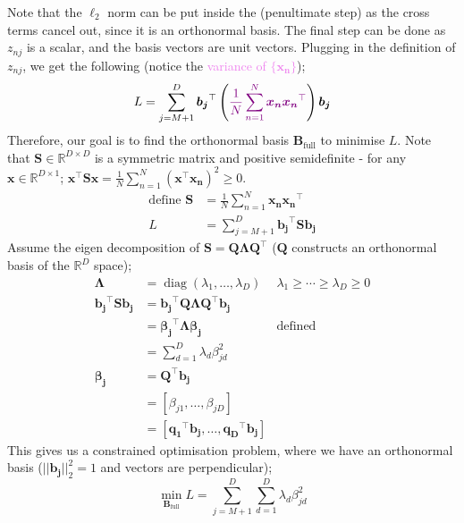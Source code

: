 \documentclass[a4paper, 12pt]{article}
\newcommand{\summation}[2]{\sum\limits_{#1}^{#2}}
\newcommand{\mat}[1]{\boldsymbol{#1}}
\renewcommand{\vec}[1]{\boldsymbol{#1}}
\newcommand{\mbbr}[0]{\mathbb{R}}
\DeclareMathOperator*{\diag}{diag}
\newcommand{\violet}[1]{\textcolor{violet}{#1}}
\begin{document}
                Note that the $\ell_2$ norm can be put inside the (penultimate step) as the cross terms cancel out, since it is an orthonormal basis.
                The final step can be done as $z_{nj}$ is a scalar, and the basis vectors are unit vectors.
                Plugging in the definition of $z_{nj}$, we get the following (notice the \violet{variance of $\{ \vec{x_n} \}$});
                $$L = \summation{j = M + 1}{D} \mat{b_j}^\top \left( \violet{\frac{1}{N} \summation{n = 1}{N} \mat{x_n}\mat{x_n}^\top} \right) \mat{b_j}$$
                Therefore, our goal is to find the orthonormal basis $\mat{B}_\text{full}$ to minimise $L$.
                Note that $\mat{S} \in \mbbr^{D \times D}$ is a symmetric matrix and positive semidefinite - for any $\mat{x} \in \mbbr^{D \times 1}$;
                $\mat{x}^\top\mat{S}\mat{x} = \frac{1}{N} \summation{n = 1}{N} (\mat{x}^\top\mat{x_n})^2 \geq 0$.
                \begin{align*}
                    \text{define } \mat{S} & = \frac{1}{N} \summation{n = 1}{N} \mat{x_n}\mat{x_n}^\top \\
                    L & = \summation{j = M + 1}{D} \mat{b_j}^\top \mat{S} \mat{b_j}
                \end{align*}
                Assume the eigen decomposition of $\mat{S} = \mat{Q}\mat{\Lambda}\mat{Q}^\top$ ($\mat{Q}$ constructs an orthonormal basis of the $\mbbr^D$ space);
                \begin{align*}
                    \mat{\Lambda} & = \diag(\lambda_1, \dots, \lambda_D) & \lambda_1 \geq \cdots \geq \lambda_D \geq 0 \\
                    \mat{b_j}^\top\mat{S}\mat{b_j} & = \mat{b_j}^\top\mat{Q}\mat{\Lambda}\mat{Q}^\top\mat{b_j} \\
                    & = \mat{\beta_j}^\top\mat{\Lambda}\mat{\beta_j} & \text{defined} \\
                    & = \summation{d = 1}{D} \lambda_d \beta_{jd}^2 \\
                    \mat{\beta_j} & = \mat{Q}^\top\mat{b_j} \\
                    & = [\beta_{j1}, \dots, \beta_{jD}] \\
                    & = [\mat{q_1}^\top\mat{b_j}, \dots, \mat{q_D}^\top\mat{b_j}]
                \end{align*}
                This gives us a constrained optimisation problem, where we have an orthonormal basis ($|| \mat{b_j} ||_2^2 = 1$ and vectors are perpendicular);
                $$\min_{\mat{B}_\text{full}} L = \summation{j = M+1}{D} \summation{d = 1}{D} \lambda_d \beta_{jd}^2$$
\end{document}
